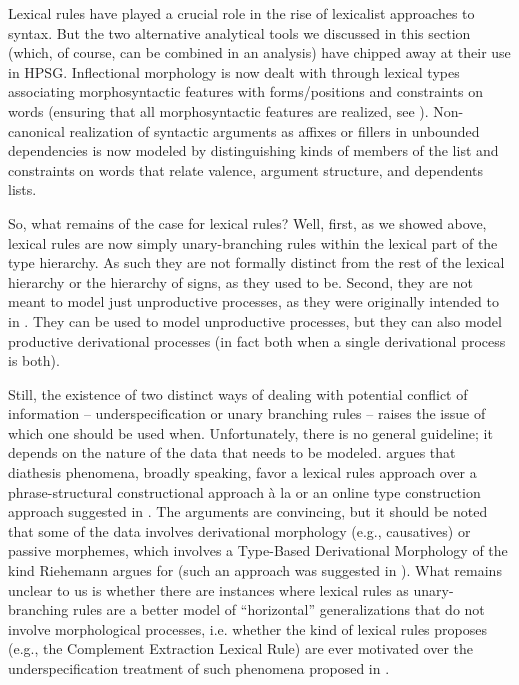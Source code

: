 \documentclass[output=paper]{langsci/langscibook}
\begin{document}
Lexical rules have played a crucial role in the rise of lexicalist approaches to syntax. But the two alternative analytical tools we discussed in this section (which, of course, can be combined in an analysis) have chipped away at their use in HPSG. Inflectional morphology is now dealt with through lexical types associating morphosyntactic features with forms/positions and constraints on words (ensuring that all morphosyntactic features are realized, see ). 
Non-canonical realization of syntactic arguments as affixes or fillers in unbounded dependencies is now modeled by distinguishing kinds of members of the  list and constraints on words that relate valence, argument structure, and dependents lists. 

So, what remains of the case for lexical rules? Well, first, as we showed above, lexical rules are now simply unary-branching rules within the lexical part of the type hierarchy. As such they are not formally distinct from the rest of the lexical hierarchy or the hierarchy of signs, as they used to be. Second, they are not meant to model just unproductive processes, as they were originally intended to in \citet{Jackendoff1975,Bochner1993}. They can be used to model unproductive processes, but they can also model productive derivational processes (in fact both when a single derivational process is both).

Still, the existence of two distinct ways of dealing with potential conflict of information -- underspecification or unary branching rules -- raises the issue of which one should be used when. Unfortunately, there is no general guideline; it depends on the nature of the data that needs to be modeled. \citet{Mueller2006,Mueller2010} argues that diathesis phenomena, broadly speaking, favor a lexical rules approach over a phrase-structural constructional approach à la \citet{Goldberg1995}  or an online type construction approach suggested in . The arguments are convincing, but it should be noted that some of the data involves derivational morphology (e.g., causatives) or passive morphemes, which involves a Type-Based Derivational Morphology of the kind Riehemann argues for (such an approach was suggested in \citet[Chapter~4]{Koenig1999c}). What remains unclear to us is whether there are instances where lexical rules as unary-branching rules are a better model of ``horizontal'' generalizations that do not involve morphological processes, i.e. whether the kind of lexical rules \citet{PollardandSag1994} proposes (e.g., the Complement Extraction Lexical Rule) are ever motivated over the  underspecification treatment of such phenomena proposed in \citet{Boumaetal2001}.
\end{document}
